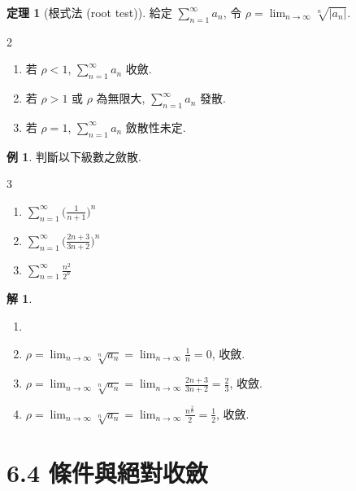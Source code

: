 \documentclass[12pt]{extarticle}
\newcommand{\ds}{\displaystyle}
\theoremstyle{definition}
\newtheorem*{thm}{定理}
\newtheorem*{ex}{例}
\newtheorem*{sol}{解}
\newcommand{\myline}{\noindent\makebox[\linewidth]{\rule{\paperwidth}{0.4pt}}}
\begin{document}
\begin{thm}[根式法 (root test)]
  給定 $\ds\sum_{n = 1}^\infty a_n$, 令 $\ds\rho = \lim_{n\to\infty}\sqrt[n]{|a_n|}$. 
  \begin{multicols}{2}
    \begin{enumerate}\setlength{\itemsep}{0pt}
      \item 若 $\ds\rho < 1$, $\ds\sum_{n = 1}^\infty a_n$ 收斂. 
      \item 若 $\ds\rho > 1$ 或 $\ds\rho$ 為無限大, $\ds\sum_{n = 1}^\infty a_n$ 發散. 
      \item 若 $\ds\rho = 1$, $\ds\sum_{n = 1}^\infty a_n$ 斂散性未定. 
    \end{enumerate}
  \end{multicols}
\end{thm}

\begin{ex} 判斷以下級數之斂散. 
  \begin{multicols}{3}
    \begin{enumerate}\setlength{\itemsep}{0pt}
      \item $\ds\sum_{n = 1}^\infty\Big(\frac{1}{n + 1}\Big)^n$
      \item $\ds\sum_{n = 1}^\infty\Big(\frac{2 n + 3}{3n + 2}\Big)^n$
      \item $\ds\sum_{n = 1}^\infty\frac{n^2}{2^n}$
    \end{enumerate}
  \end{multicols}
\end{ex}

\begin{sol}
  \begin{enumerate}\setlength{\itemsep}{0pt}
    \item[]
    \item $\ds\rho = \lim_{n\to\infty}\sqrt[n]{a_n} = \lim_{n\to\infty}\frac{1}{n} = 0$, 收斂. 
    \item $\ds\rho = \lim_{n\to\infty}\sqrt[n]{a_n} = \lim_{n\to\infty}\frac{2 n + 3}{3 n + 2} = \frac{2}{3}$, 收斂. 
    \item $\ds\rho = \lim_{n\to\infty}\sqrt[n]{a_n} = \lim_{n\to\infty}\frac{n^{\frac{2}{n}}}{2} = \frac{1}{2}$, 收斂. 
  \end{enumerate}
\end{sol}

\myline

\section*{6.4 條件與絕對收斂}
\end{document}
